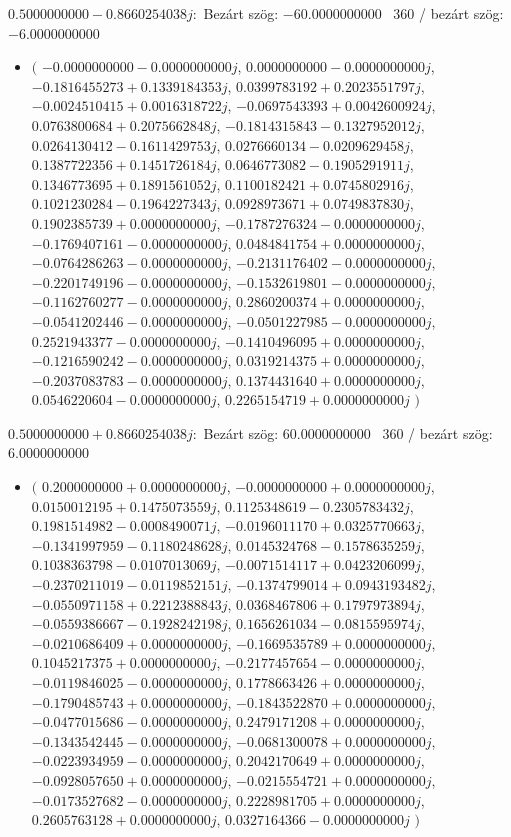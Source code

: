 \documentclass[14pt,a4paper]{article}
\begin{document}
$0.5000000000-0.8660254038j$:\
Bezárt szög: $-60.0000000000$ \
360 / bezárt szög: $-6.0000000000$\
\begin{itemize}
\item
$\big($
$-0.0000000000-0.0000000000j$, $0.0000000000-0.0000000000j$, $-0.1816455273+0.1339184353j$, $0.0399783192+0.2023551797j$, $-0.0024510415+0.0016318722j$, $-0.0697543393+0.0042600924j$, $0.0763800684+0.2075662848j$, $-0.1814315843-0.1327952012j$, $0.0264130412-0.1611429753j$, $0.0276660134-0.0209629458j$, $0.1387722356+0.1451726184j$, $0.0646773082-0.1905291911j$, $0.1346773695+0.1891561052j$, $0.1100182421+0.0745802916j$, $0.1021230284-0.1964227343j$, $0.0928973671+0.0749837830j$, $0.1902385739+0.0000000000j$, $-0.1787276324-0.0000000000j$, $-0.1769407161-0.0000000000j$, $0.0484841754+0.0000000000j$, $-0.0764286263-0.0000000000j$, $-0.2131176402-0.0000000000j$, $-0.2201749196-0.0000000000j$, $-0.1532619801-0.0000000000j$, $-0.1162760277-0.0000000000j$, $0.2860200374+0.0000000000j$, $-0.0541202446-0.0000000000j$, $-0.0501227985-0.0000000000j$, $0.2521943377-0.0000000000j$, $-0.1410496095+0.0000000000j$, $-0.1216590242-0.0000000000j$, $0.0319214375+0.0000000000j$, $-0.2037083783-0.0000000000j$, $0.1374431640+0.0000000000j$, $0.0546220604-0.0000000000j$, $0.2265154719+0.0000000000j$
$\big)$
\end{itemize}
$0.5000000000+0.8660254038j$:\
Bezárt szög: $60.0000000000$ \
360 / bezárt szög: $6.0000000000$\
\begin{itemize}
\item
$\big($
$0.2000000000+0.0000000000j$, $-0.0000000000+0.0000000000j$, $0.0150012195+0.1475073559j$, $0.1125348619-0.2305783432j$, $0.1981514982-0.0008490071j$, $-0.0196011170+0.0325770663j$, $-0.1341997959-0.1180248628j$, $0.0145324768-0.1578635259j$, $0.1038363798-0.0107013069j$, $-0.0071514117+0.0423206099j$, $-0.2370211019-0.0119852151j$, $-0.1374799014+0.0943193482j$, $-0.0550971158+0.2212388843j$, $0.0368467806+0.1797973894j$, $-0.0559386667-0.1928242198j$, $0.1656261034-0.0815595974j$, $-0.0210686409+0.0000000000j$, $-0.1669535789+0.0000000000j$, $0.1045217375+0.0000000000j$, $-0.2177457654-0.0000000000j$, $-0.0119846025-0.0000000000j$, $0.1778663426+0.0000000000j$, $-0.1790485743+0.0000000000j$, $-0.1843522870+0.0000000000j$, $-0.0477015686-0.0000000000j$, $0.2479171208+0.0000000000j$, $-0.1343542445-0.0000000000j$, $-0.0681300078+0.0000000000j$, $-0.0223934959-0.0000000000j$, $0.2042170649+0.0000000000j$, $-0.0928057650+0.0000000000j$, $-0.0215554721+0.0000000000j$, $-0.0173527682-0.0000000000j$, $0.2228981705+0.0000000000j$, $0.2605763128+0.0000000000j$, $0.0327164366-0.0000000000j$
$\big)$
\end{itemize}
\end{document}
